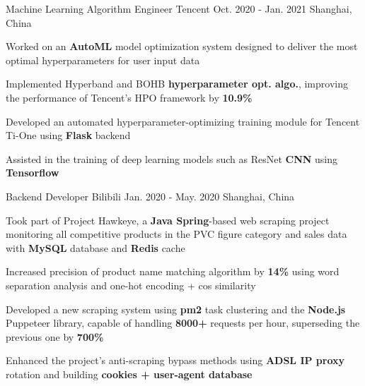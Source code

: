 

\begin{cventries}

  \cventry
    {Machine Learning Algorithm Engineer} %
    {Tencent} %
    {Oct. 2020 - Jan. 2021} %
    {Shanghai, China} %
    {
      \begin{cvitems} %
        \item {Worked on an \textbf{AutoML} model optimization system designed to deliver the most optimal hyperparameters for user input data}
        \item {Implemented Hyperband and BOHB \textbf{hyperparameter opt. algo.}, improving the performance of Tencent's HPO framework by \textbf{10.9\%}}
        \item {Developed an automated hyperparameter-optimizing training module for Tencent Ti-One using \textbf{Flask} backend}
        \item {Assisted in the training of deep learning models such as ResNet \textbf{CNN} using \textbf{Tensorflow}}
      \end{cvitems}
    }

  \cventry
    {Backend Developer} %
    {Bilibili} %
    {Jan. 2020 - May. 2020} %
    {Shanghai, China} %
    {
      \begin{cvitems} %
        \item {Took part of Project Hawkeye, a \textbf{Java Spring}-based web scraping project monitoring all competitive products in the PVC figure category and sales data with \textbf{MySQL} database and \textbf{Redis} cache}
        \item {Increased precision of product name matching algorithm by \textbf{14\%} using word separation analysis and one-hot encoding + cos similarity}
        \item {Developed a new scraping system using \textbf{pm2} task clustering and the \textbf{Node.js} Puppeteer library, capable of handling \textbf{8000+} requests per hour, superseding the previous one by \textbf{700\%}}
        \item {Enhanced the project's anti-scraping bypass methods using \textbf{ADSL IP proxy} rotation and building \textbf{cookies + user-agent database}}
      \end{cvitems}
    }


\end{cventries}
